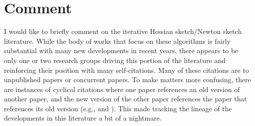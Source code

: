 \documentclass[12pt]{article}
\title{\todo} %
\author{Kenny Chiu} %
\date{\today} %
\begin{document}
\maketitle








\newpage


\section{Comment}

I would like to briefly comment on the iterative Hessian sketch/Newton sketch literature. While the body of works that focus on these algorithms is fairly substantial with many new developments in recent years, there appears to be only one or two research groups driving this portion of the literature and reinforcing their position with many self-citations. Many of these citations are to unpublished papers or concurrent papers. To make matters more confusing, there are instances of cyclical citations where one paper references an old version of another paper, and the new version of the other paper references the paper that references its old version (e.g., \citep{Lacotte:2020} and \citep{Lacotte:2020b}). This made tracking the lineage of the developments in this literature a bit of a nightmare.


\newpage




\end{document}
